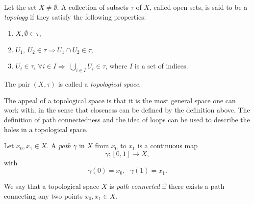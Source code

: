  
\begin{definition}[Topology]
Let the set $X\neq \emptyset$. A collection of subsets $\tau$ of $X$, called open sets, is said to be a \textit{topology} if they satisfy the following properties:
\begin{enumerate}
\item $X,\emptyset \in \tau$,
\item $U_1,\ U_2 \in \tau \Rightarrow U_1\cap U_2 \in \tau$,
\item $U_i \in \tau$, $\forall i\in I\Rightarrow$ $\bigcup_{i\in I} U_i \in \tau$, where $I$ is a set of indices.
\end{enumerate}
The pair $(X,\tau)$ is called a \textit{topological space}.
\end{definition}
The appeal of a topological space is that it is the most general space one can work with, in the sense that closeness can be defined by the definition above. The definition of path connectedness and the idea of loops can be used to describe the holes in a topological space.

\begin{definition}[Path]
Let $x_0,x_1\in X$. A \textit{path} $\gamma$ in $X$ from $x_0$ to $x_1$ is a continuous map
\begin{equation}
	\gamma: [0,1] \to X,
\end{equation}
with
\begin{equation}
	\gamma(0) = x_0, \ \ \ \gamma(1) = x_1.
\end{equation}
\end{definition}
We say that a topological space $X$ is \textit{path connected} if there exists a path connecting any two points $x_0,x_1\in X$.

